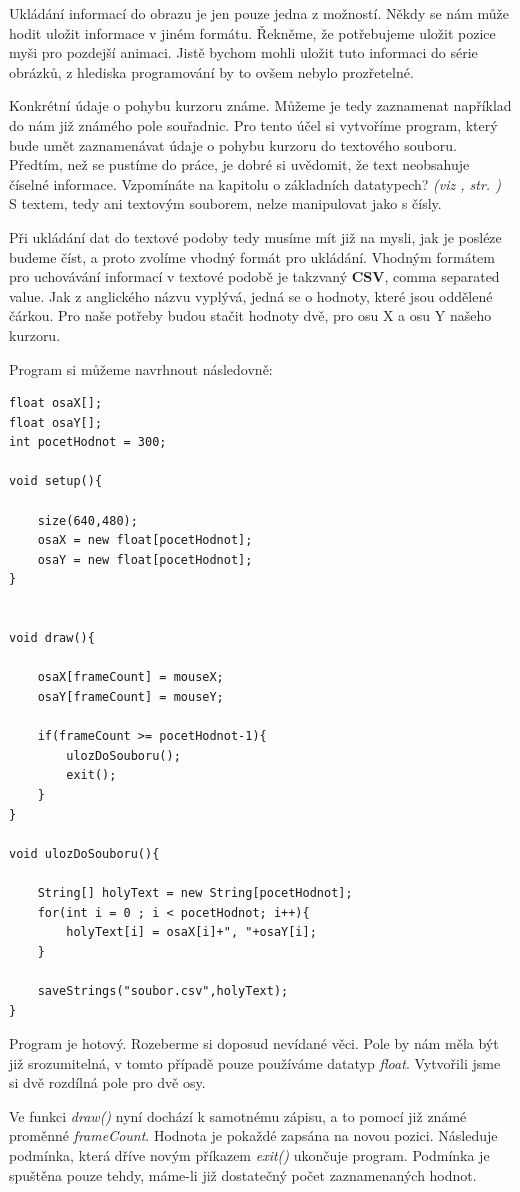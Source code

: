 \documentclass[10pt]{book}
\newcommand{\slovnik}[1]{\textbf{\gls{#1}}\index{#1}\label{#1}}
\newcommand{\vyraz}[1]{\textit{\gls{#1}}\index{#1}\label{#1}}
\newcommand{\odkaz}[1]{\textit{(viz \nameref{#1}, str. \pageref*{#1})}}
\begin{document}
Ukládání informací do obrazu je jen pouze jedna z možností. Někdy se nám může hodit uložit informace v jiném formátu. Řekněme, že potřebujeme uložit pozice myši pro pozdejší animaci. Jistě bychom mohli uložit tuto informaci do série obrázků, z hlediska programování by to ovšem nebylo prozřetelné.

Konkrétní údaje o pohybu kurzoru známe. Můžeme je tedy zaznamenat například do nám již známého pole souřadnic. Pro tento účel si vytvoříme program, který bude umět zaznamenávat údaje o pohybu kurzoru do textového souboru. Předtím, než se pustíme do práce, je dobré si uvědomit, že text neobsahuje číselné informace. Vzpomínáte na kapitolu o základních datatypech? \odkaz{Základní datatypy} S textem, tedy ani textovým souborem, nelze manipulovat jako s čísly.

Při ukládání dat do textové podoby tedy musíme mít již na mysli, jak je posléze budeme číst, a proto zvolíme vhodný formát pro ukládání. Vhodným formátem pro uchovávání informací v textové podobě je takzvaný \slovnik{CSV}, comma separated value. Jak z anglického názvu vyplývá, jedná se o hodnoty, které jsou oddělené čárkou. Pro naše potřeby budou stačit hodnoty dvě, pro osu X a osu Y našeho kurzoru.

Program si můžeme navrhnout následovně:

\begin{lstlisting}
float osaX[];
float osaY[];
int pocetHodnot = 300;

void setup(){

	size(640,480);
	osaX = new float[pocetHodnot];
	osaY = new float[pocetHodnot];
}


void draw(){

	osaX[frameCount] = mouseX;
	osaY[frameCount] = mouseY;

	if(frameCount >= pocetHodnot-1){
		ulozDoSouboru();
		exit();
	}
}

void ulozDoSouboru(){

	String[] holyText = new String[pocetHodnot];
	for(int i = 0 ; i < pocetHodnot; i++){
		holyText[i] = osaX[i]+", "+osaY[i];
	}
	
	saveStrings("soubor.csv",holyText);
}
\end{lstlisting}

Program je hotový. Rozeberme si doposud nevídané věci. Pole by nám měla být již srozumitelná, v tomto případě pouze používáme datatyp \vyraz{float}. Vytvořili jsme si dvě rozdílná pole pro dvě osy.

 Ve funkci \vyraz{draw()} nyní dochází k samotnému zápisu, a to pomocí již známé proměnné \vyraz{frameCount}. Hodnota je pokaždé zapsána na novou pozici. Následuje podmínka, která dříve novým příkazem \vyraz{exit()} ukončuje program. Podmínka je spuštěna pouze tehdy, máme-li již dostatečný počet zaznamenaných hodnot.
 
\end{document}
